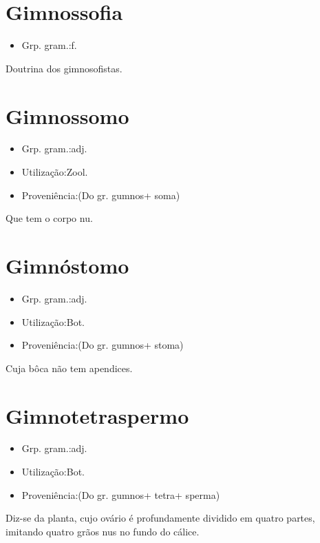 \section{Gimnossofia}
\begin{itemize}
\item {Grp. gram.:f.}
\end{itemize}
Doutrina dos gimnosofistas.
\section{Gimnossomo}
\begin{itemize}
\item {Grp. gram.:adj.}
\end{itemize}
\begin{itemize}
\item {Utilização:Zool.}
\end{itemize}
\begin{itemize}
\item {Proveniência:(Do gr. \textunderscore gumnos\textunderscore  + \textunderscore soma\textunderscore )}
\end{itemize}
Que tem o corpo nu.
\section{Gimnóstomo}
\begin{itemize}
\item {Grp. gram.:adj.}
\end{itemize}
\begin{itemize}
\item {Utilização:Bot.}
\end{itemize}
\begin{itemize}
\item {Proveniência:(Do gr. \textunderscore gumnos\textunderscore  + \textunderscore stoma\textunderscore )}
\end{itemize}
Cuja bôca não tem apendices.
\section{Gimnotetraspermo}
\begin{itemize}
\item {Grp. gram.:adj.}
\end{itemize}
\begin{itemize}
\item {Utilização:Bot.}
\end{itemize}
\begin{itemize}
\item {Proveniência:(Do gr. \textunderscore gumnos\textunderscore  + \textunderscore tetra\textunderscore  + \textunderscore sperma\textunderscore )}
\end{itemize}
Diz-se da planta, cujo ovário é profundamente dividido em quatro partes, imitando quatro grãos nus no fundo do cálice.

